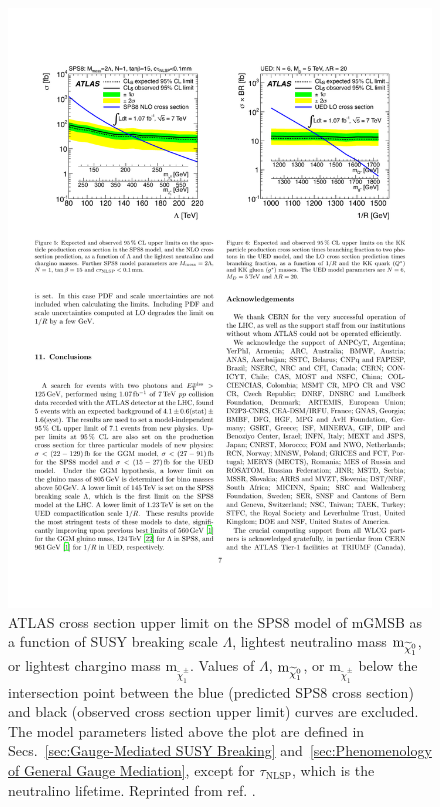 \documentclass[dissertation.tex]{subfiles}
\begin{document}
\begin{figure}
	\centering
	\includegraphics[scale=0.9]{ATLAS_SPS8_limit}
	\caption{ATLAS cross section upper limit on the SPS8 \cite{springerlink:10.1007/s10052-002-0949-3} model of mGMSB as a function of SUSY breaking scale $\Lambda$, lightest neutralino mass $\mbox{m}_{\widetilde{\chi}_{1}^{0}}$, or lightest chargino mass $\mbox{m}_{\widetilde{\chi}_{1}^{\pm}}$.  Values of $\Lambda$, $\mbox{m}_{\widetilde{\chi}_{1}^{0}}$, or $\mbox{m}_{\widetilde{\chi}_{1}^{\pm}}$ below the intersection point between the blue (predicted SPS8 cross section) and black (observed cross section upper limit) curves are excluded.  The model parameters listed above the plot are defined in Secs.~\ref{sec:Gauge-Mediated SUSY Breaking} and~\ref{sec:Phenomenology of General Gauge Mediation}, except for $\tau_{\mathrm{NLSP}}$, which is the neutralino lifetime.  Reprinted from ref. \cite{Aad2012519}.}
	\label{fig:ATLAS_SPS8_limit}
\end{figure}
\end{document}
